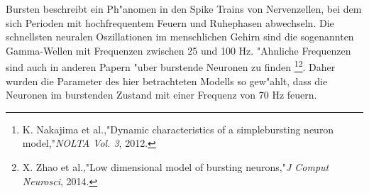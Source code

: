\documentclass[12pt,a4paper]{article}
\begin{document}
\newpage
Bursten beschreibt ein Ph"anomen in den Spike Trains von Nervenzellen, bei dem sich Perioden mit hochfrequentem Feuern und Ruhephasen abwechseln. Die schnellsten neuralen Oszillationen im menschlichen Gehirn sind die sogenannten Gamma-Wellen mit Frequenzen zwischen 25 und 100 Hz. "Ahnliche Frequenzen sind auch in anderen Papern "uber burstende Neuronen zu finden \footnote[6]{K. Nakajima et al.,"Dynamic characteristics of a simplebursting neuron model,"\textit{NOLTA Vol. 3}, 2012.}\footnote[7]{
X. Zhao et al.,"Low dimensional model of bursting neurons,"\textit{J Comput Neurosci}, 2014. }. Daher wurden die Parameter des hier betrachteten Modells so gew"ahlt, dass die Neuronen im burstenden Zustand mit einer Frequenz von 70 Hz feuern.
\end{document}
